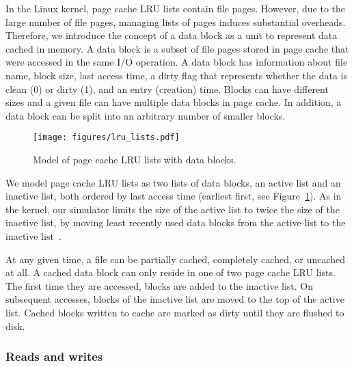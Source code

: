 \documentclass[conference]{IEEEtran}
\begin{document}
    In the Linux kernel, page cache LRU lists contain file pages. However, 
    due to the large number of file pages, managing lists of pages 
    induces substantial overheads.
    Therefore, we introduce the concept of a data block as a unit to represent data 
    cached in memory. A data block is a subset of file pages stored in
    page cache that were accessed in the same I/O operation. 
    A data block has information about file name, block size, last access 
    time, a dirty flag that represents whether the data is clean (0) 
    or dirty (1), and an entry (creation) time.
    Blocks can have different sizes and a given file can have multiple 
    data blocks in page cache. In addition, a data block can be split into an 
    arbitrary number of smaller blocks.
    \begin{figure}
           \centering
           \texttt{[image: figures/lru\_lists.pdf]}
           \caption{Model of page cache LRU lists with data blocks.}    \label{fig:lrulist}
    \end{figure}    
    
    We model page cache LRU lists as 
    two lists of data blocks, an active list and an inactive list, both ordered by 
    last access time (earliest first, see Figure~\ref{fig:lrulist}).
    As in the kernel, our simulator limits the size of the active list to
    twice the size of the inactive list, by moving least recently 
    used data blocks from the active list to the inactive list~\cite{gorman2004understanding, linuxdev3rd2010}.

    At any given time, a file can be partially cached, completely cached,
    or uncached at all. A cached data block can only reside in one of two 
    page cache LRU lists. The first time they are accessed, blocks are
    added to the inactive list. On subsequent accesses, blocks of the
    inactive list are moved to the top of the active list. Cached blocks 
    written to cache are marked as dirty until they are flushed to disk.

    \subsubsection{Reads and writes}
\end{document}
